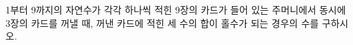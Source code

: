 1부터 9까지의 자연수가 각각 하나씩 적힌 9장의 카드가 들어 있는 주머니에서 동시에 3장의 카드를 꺼낼 때, 꺼낸 카드에 적힌 세 수의 합이 홀수가 되는 경우의 수를 구하시오.
